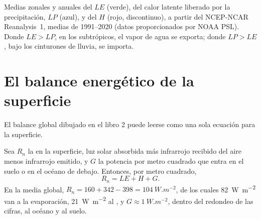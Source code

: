 \begin{omfigure}

{\small Medias zonales y anuales del  $LE$ (verde), del calor latente liberado por la precipitación, $LP$ (azul), y del  $H$ (rojo, discontinuo), a partir del NCEP-NCAR Reanalysis~1, medias de 1991--2020 (datos proporcionados por NOAA PSL). Donde $LE > LP$, en los subtrópicos, el vapor de agua se exporta; donde $LP > LE$, bajo los cinturones de lluvia, se importa.}
\label{fig:b1:radiation-heat-transport:surface}
\end{omfigure}

\section{El balance energético de la superficie}\label{sec:b1:radiation-heat-transport:surface}

El balance global dibujado en el libro 2 puede leerse como una sola ecuación para la superficie.

\begin{proposition}\label{prop:b1:radiation-heat-transport:surface}
Sea $R_n$ la  en la superficie, luz solar absorbida más infrarrojo recibido del aire menos infrarrojo emitido, y $G$ la potencia por metro cuadrado que entra en el suelo o en el océano de debajo. Entonces, por metro cuadrado,
\[
  R_n = LE + H + G .
\]
En la media global, $R_n = 160 + 342 - 398 = \qty{104}{W.m^{-2}}$, de los cuales
\qty{82}{W.m^{-2}} van a la evaporación, \qty{21}{W.m^{-2}} al , y $G \approx \qty{1}{W.m^{-2}}$, dentro del redondeo de las cifras, al océano y al suelo.
\end{proposition}

